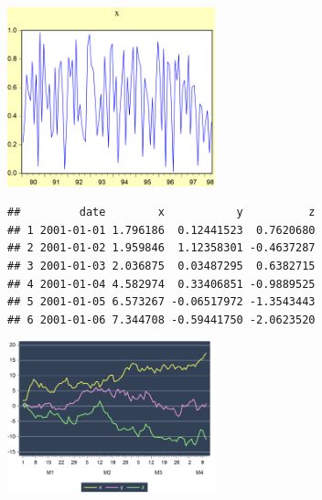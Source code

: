\documentclass[
]{article}
\begin{document}
\begin{center}\includegraphics[width=0.45\textwidth]{test_engEviews_files/figure-latex//eview-graph-x} \end{center}

\begin{verbatim}
##         date        x           y          z
## 1 2001-01-01 1.796186  0.12441523  0.7620680
## 2 2001-01-02 1.959846  1.12358301 -0.4637287
## 3 2001-01-03 2.036875  0.03487295  0.6382715
## 4 2001-01-04 4.582974  0.33406851 -0.9889525
## 5 2001-01-05 6.573267 -0.06517972 -1.3543443
## 6 2001-01-06 7.344708 -0.59441750 -2.0623520
\end{verbatim}

\begin{center}\includegraphics[width=0.45\textwidth]{test_engEviews_files/figure-latex//rwalk-xyz} \end{center}
\end{document}
